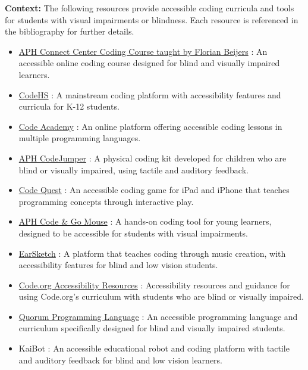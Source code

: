 \noindent
\textbf{Context:} The following resources provide accessible coding curricula and tools for students with visual impairments or blindness. Each resource is referenced in the bibliography for further details.

\begin{itemize}
  \item \href{https://zersiax.github.io/}{APH Connect Center Coding Course taught by Florian Beijers} \cite{BeijersAPH}: An accessible online coding course designed for blind and visually impaired learners.
  \item \href{https://codehs.com/}{CodeHS} \cite{CodeHS}: A mainstream coding platform with accessibility features and curricula for K-12 students.
  \item \href{https://www.codecademy.com/}{Code Academy} \cite{CodeAcademy}: An online platform offering accessible coding lessons in multiple programming languages.
  \item \href{https://codejumper.com/}{APH CodeJumper} \cite{APHCodeJumper,APHCodeJumperMS}: A physical coding kit developed for children who are blind or visually impaired, using tactile and auditory feedback.
  \item \href{https://www.aph.org/product/code-quest-for-ipad-iphone/}{Code Quest} \cite{CodeQuest}: An accessible coding game for iPad and iPhone that teaches programming concepts through interactive play.
  \item \href{https://www.aph.org/product/accessible-code-and-go-mouse/}{APH Code \& Go Mouse} \cite{CodeGoMouse}: A hands-on coding tool for young learners, designed to be accessible for students with visual impairments.
  \item \href{https://earsketch.gatech.edu/landing/}{EarSketch} \cite{EarSketchLanding,EarSketchTeaching}: A platform that teaches coding through music creation, with accessibility features for blind and low vision students.
  \item \href{https://code.org/accessibility}{Code.org Accessibility Resources} \cite{CodeOrgAccessibility}: Accessibility resources and guidance for using Code.org's curriculum with students who are blind or visually impaired.
  \item \href{https://quorumlanguage.com/}{Quorum Programming Language} \cite{QuorumLanguage}: An accessible programming language and curriculum specifically designed for blind and visually impaired students.
  \item KaiBot \cite{KaiBot}: An accessible educational robot and coding platform with tactile and auditory feedback for blind and low vision learners.
\end{itemize}

